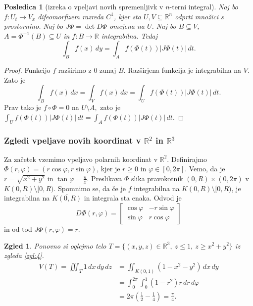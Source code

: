 \documentclass[10pt, a4paper]{article}
\newtheorem{posledica}[izr]{Posledica}
\newtheorem{zgled}{Zgled}[section]
\newenvironment{noticeC}{%
  \tcolorbox[%
  notitle,
  empty,
  enhanced,  %
  breakable,
  coltext=black, 
  fontupper=\rmfamily,
  parbox=false,
  noparskip,
  sharp corners,
  boxrule=-1pt,  %
  frame hidden,
  left=7pt,  %
  right=7pt,
  top=5pt,
  bottom=5pt,
  before skip=2.5ex plus 2pt,
  after skip=2.5ex plus 2pt,
  overlay unbroken and last={%
  },
  ]}
{\endtcolorbox}
\newenvironment{dokaz}%
  {\begin{noticeC}\begin{proof}}%
  {\end{proof}\end{noticeC}}
\newcommand{\R}{\mathbb {R}}
\begin{document}
\begin{posledica}[izreka o vpeljavi novih spremenljivk v $n$-terni integral]
    Naj bo $f: U_t \to V_x$ difeomorfizem razreda $C^1$,
    kjer sta $U, V \subseteq \R^n$ odprti množici s prostornino.
    Naj bo $J \Phi = \det D\Phi$ omejena na $U$.
    Naj bo $B \subseteq V$, $A = \Phi^{-1}(B) \subseteq U$ in $f: B \to \R$ integrabilna.
    Tedaj $$\int_B f(x)\, dy = \int_A f(\Phi (t)) |J\Phi (t)|\, dt.$$
\end{posledica}

\begin{dokaz}
    Funkcijo $f$ razširimo z $0$ zunaj $B$.
    Razširjena funkcija je integrabilna na $V$.
    Zato je 
    $$\int_B f(x)\, dx = \int_V f(x)\, dx = \int_U f(\Phi(t)) |J\Phi(t)|\, dt.$$
    Prav tako je $f \circ \Phi = 0$ na $U \setminus A,$ zato je 
    $\int_U f(\Phi(t)) |J\Phi(t)|\, dt = \int_A f(\Phi(t)) |J\Phi(t)|\, dt$.
\end{dokaz}





\subsubsection{Zgledi vpeljave novih koordinat v $\R^2$ in $\R^3$}

Za začetek vzemimo vpeljavo polarnih koordinat v $\R^2$.
Definirajmo $\Phi (r, \varphi) = (r \cos \varphi, r \sin \varphi)$, kjer je $r \geq 0$ in $\varphi \in [0, 2\pi]$.
Vemo, da je $r = \sqrt{x^2 + y^2}$ in $\tan \varphi = \frac{y}{x}$.
Preslikava $\Phi$ slika pravokotnik $(0, R) \times (0, 2\pi)$ v $K(0, R) \setminus [0, R)$.
Spomnimo se, da če je $f$ integrabilna na $K(0, R) \setminus [0, R)$,
je integrabilna na $\overline{K(0, R)}$ in integrala sta enaka.
Odvod je 
$$D\Phi (r, \varphi) = \begin{bmatrix}
    \cos \varphi & -r \sin \varphi\\
    \sin \varphi & r \cos \varphi
\end{bmatrix}$$
in od tod $J\Phi (r, \varphi) = r$.

\begin{zgled}
    Ponovno si oglejmo telo $T = \{(x, y, z) \in \R^3,\ z \leq 1,\ z \geq x^2 + y^2\}$ iz zgleda \ref{zgl:4}.
    \begin{align*}
        V(T) = \iiint_T 1 \, dx\, dy\, dz &= \iint_{K(0, 1)} \left(1 - x^2 - y^2\right)\, dx\, dy\\
        &= \int_{0} ^{2\pi} \int_0 ^1 (1 - r^2) r \, dr\, d\varphi\\
        &= 2 \pi \left(\frac{1}{2} - \frac{1}{4}\right) = \frac{\pi}{4}.
    \end{align*}
\end{zgled}
\end{document}
